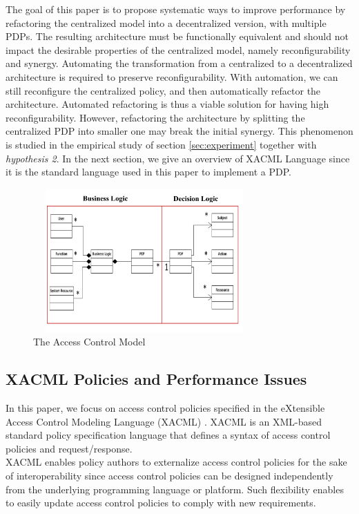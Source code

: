 The goal of this paper is to propose systematic ways to improve performance by refactoring the centralized model into a decentralized version, with multiple PDPs. The resulting
 architecture must be functionally equivalent and should not impact the desirable properties of the centralized model, namely reconfigurability and synergy.
Automating the transformation from a centralized to a decentralized architecture is required to preserve reconfigurability. With automation, we can still reconfigure the centralized policy, 
and then automatically refactor the architecture. Automated refactoring is thus a viable solution for having high reconfigurability.  
However, refactoring the architecture by splitting the centralized PDP into smaller one may break the initial synergy. This phenomenon is studied in the empirical study of section 
\ref{sec:experiment} together with \textit{hypothesis 2}. In the next section, we give an overview of XACML Language since it is the standard language used in this paper to implement a PDP.


\begin{figure}[!h]
\begin{center}
\includegraphics[height=5.5cm,width=8.5cm]{model}
\caption{The Access Control Model}
\label{model}
\end{center}
\end{figure}

\subsection{XACML Policies and Performance Issues}

In this paper, we focus on access control policies specified in the eXtensible Access Control Modeling Language (XACML) \cite{sunxacml}.
XACML is an XML-based standard policy specification language that defines a syntax of access control policies and
request/response. \\XACML enables policy authors to externalize access control policies for the sake of interoperability since access control policies can be designed 
independently from the underlying programming language or platform. Such flexibility enables to easily update access control policies to comply with new requirements.

